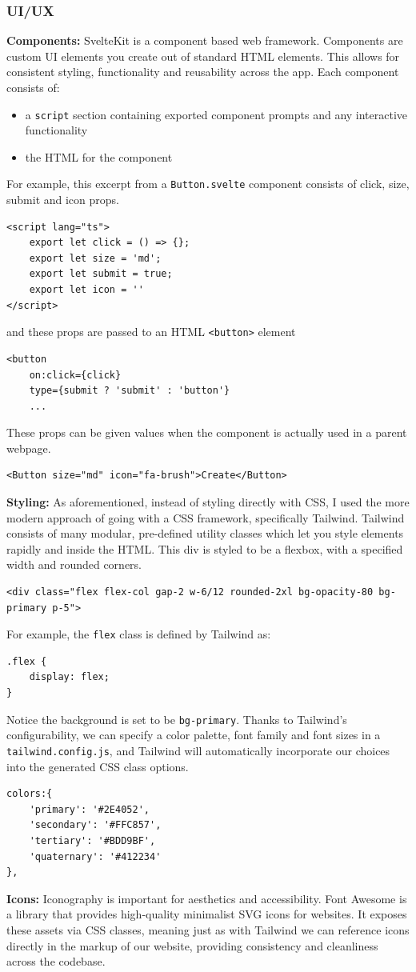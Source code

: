 \documentclass[12pt,a4paper]{article}
\begin{document}
\subsubsection{UI/UX}
\textbf{Components:} SvelteKit is a component based web framework. Components are custom UI elements you create out of standard HTML elements. This allows for consistent styling, functionality and reusability across the app. Each component consists of:
\begin{itemize}
    \item a \verb|script| section containing exported component prompts and any interactive functionality
    \item the HTML for the component
\end{itemize}
For example, this excerpt from a \verb|Button.svelte| component consists of click, size, submit and icon props. 
\begin{lstlisting}
<script lang="ts">
    export let click = () => {};
    export let size = 'md';
    export let submit = true;
    export let icon = ''
</script>
\end{lstlisting}
and these props are passed to an HTML \verb|<button>| element
\begin{lstlisting}
<button 
    on:click={click}
    type={submit ? 'submit' : 'button'}
    ...
\end{lstlisting}
These props can be given values when the component is actually used in a parent webpage.
\begin{lstlisting}
<Button size="md" icon="fa-brush">Create</Button>
\end{lstlisting}
\textbf{Styling:} As aforementioned, instead of styling directly with CSS, I used the more modern approach of going with a CSS framework, specifically Tailwind. Tailwind consists of many modular, pre-defined utility classes which let you style elements rapidly and inside the HTML. This div is styled to be a flexbox, with a specified width and rounded corners.
\begin{lstlisting}
<div class="flex flex-col gap-2 w-6/12 rounded-2xl bg-opacity-80 bg-primary p-5">
\end{lstlisting}
For example, the \verb|flex| class is defined by Tailwind as:
\begin{lstlisting}
.flex {
    display: flex;
}
\end{lstlisting}
Notice the background is set to be \verb|bg-primary|. Thanks to Tailwind's configurability, we can specify a color palette, font family and font sizes in a \verb|tailwind.config.js|, and Tailwind will automatically incorporate our choices into the generated CSS class options.
\begin{lstlisting}
colors:{
    'primary': '#2E4052',
    'secondary': '#FFC857',
    'tertiary': '#BDD9BF',
    'quaternary': '#412234'
},
\end{lstlisting}
\textbf{Icons:} Iconography is important for aesthetics and accessibility. Font Awesome is a library that provides high-quality minimalist SVG icons for websites. It exposes these assets via CSS classes, meaning just as with Tailwind we can reference icons directly in the markup of our website, providing consistency and cleanliness across the codebase. 
\end{document}
